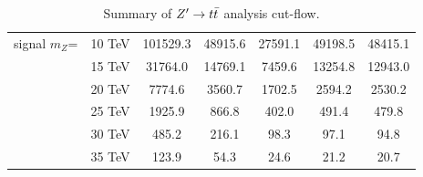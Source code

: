 \documentclass{cernrep}
\begin{document}
\begin{landscape}
\begin{table}[!htb]
{\begin{tabular}{|c|c|c|c|c|c|c|}
\hline
signal $m_{Z}$= & 10 TeV        & 101529.3     & 48915.6       & 27591.1     & 49198.5     & 48415.1     \\
                & 15 TeV        & 31764.0      & 14769.1       & 7459.6      & 13254.8     & 12943.0     \\
                & 20 TeV        & 7774.6       & 3560.7        & 1702.5      & 2594.2      & 2530.2      \\
                & 25 TeV        & 1925.9       & 866.8         & 402.0       & 491.4       & 479.8       \\
                & 30 TeV        & 485.2        & 216.1         & 98.3        & 97.1        & 94.8        \\
                & 35 TeV        & 123.9        & 54.3          & 24.6        & 21.2        & 20.7        \\
\hline
\hline
\end{tabular}}
\caption{Summary of $Z^{\prime} \rightarrow t\bar{t}$ analysis cut-flow.}
\label{tab:Zptt_cutflow}
\end{table}
\end{landscape}
\end{document}
